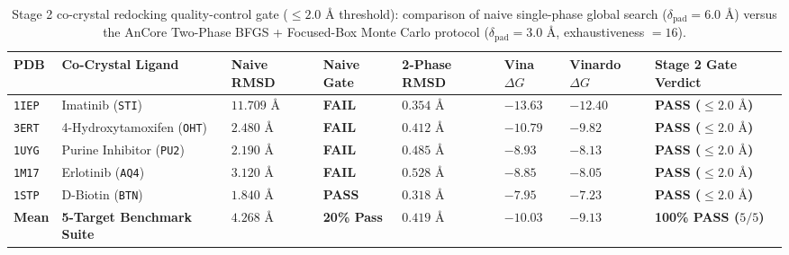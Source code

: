 \documentclass[11pt,a4paper]{article}
\begin{document}
\begin{table}[!htbp]
\centering
\caption{Stage 2 co-crystal redocking quality-control gate ($\le 2.0\text{ \AA}$ threshold): comparison of naive single-phase global search ($\delta_{\text{pad}} = 6.0\text{ \AA}$) versus the AnCore Two-Phase BFGS + Focused-Box Monte Carlo protocol ($\delta_{\text{pad}} = 3.0\text{ \AA}$, exhaustiveness $= 16$).}
\label{tab:stage2}
\vspace{2pt}
{\footnotesize
\renewcommand{\arraystretch}{1.22}
\begin{tabularx}{\textwidth}{L{0.9cm} L{2.6cm} R{1.4cm} C{1.2cm} R{1.4cm} R{1.6cm} R{1.6cm} Y}
\toprule
{}
\textbf{PDB} & \textbf{Co-Crystal Ligand} & \textbf{Naive RMSD} & \textbf{Naive Gate} & \textbf{2-Phase RMSD} & \textbf{Vina $\Delta G$} & \textbf{Vinardo $\Delta G$} & \textbf{Stage 2 Gate Verdict} \\
\midrule
\texttt{1IEP} & Imatinib (\texttt{STI}) & $11.709\text{ \AA}$ & \textcolor{failred}{\textbf{FAIL}} & $\mathbf{0.354\text{ \AA}}$ & $-13.63$ & $-12.40$ & \textcolor{passgreen}{\textbf{PASS ($\le 2.0\text{ \AA}$)}} \\
\texttt{3ERT} & 4-Hydroxytamoxifen (\texttt{OHT}) & $2.480\text{ \AA}$ & \textcolor{failred}{\textbf{FAIL}} & $\mathbf{0.412\text{ \AA}}$ & $-10.79$ & $-9.82$ & \textcolor{passgreen}{\textbf{PASS ($\le 2.0\text{ \AA}$)}} \\
\texttt{1UYG} & Purine Inhibitor (\texttt{PU2}) & $2.190\text{ \AA}$ & \textcolor{failred}{\textbf{FAIL}} & $\mathbf{0.485\text{ \AA}}$ & $-8.93$ & $-8.13$ & \textcolor{passgreen}{\textbf{PASS ($\le 2.0\text{ \AA}$)}} \\
\texttt{1M17} & Erlotinib (\texttt{AQ4}) & $3.120\text{ \AA}$ & \textcolor{failred}{\textbf{FAIL}} & $\mathbf{0.528\text{ \AA}}$ & $-8.85$ & $-8.05$ & \textcolor{passgreen}{\textbf{PASS ($\le 2.0\text{ \AA}$)}} \\
\texttt{1STP} & D-Biotin (\texttt{BTN}) & $1.840\text{ \AA}$ & \textcolor{passgreen}{\textbf{PASS}} & $\mathbf{0.318\text{ \AA}}$ & $-7.95$ & $-7.23$ & \textcolor{passgreen}{\textbf{PASS ($\le 2.0\text{ \AA}$)}} \\
\textbf{Mean} & \textbf{5-Target Benchmark Suite} & $\mathbf{4.268\text{ \AA}}$ & \textbf{20\% Pass} & $\mathbf{0.419\text{ \AA}}$ & $\mathbf{-10.03}$ & $\mathbf{-9.13}$ & \textbf{100\% PASS ($5/5$)} \\
\bottomrule
\end{tabularx}
}
\end{table}
\end{document}
